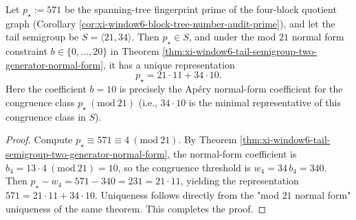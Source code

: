 \begin{corollary}[Ap\'ery Normal Form and Uniqueness of the Audit Prime \texorpdfstring{$p_\star=571$}{p*=571} for the Tail Semigroup]\label{cor:xi-audit-prime-571-apery-normal-form}
Let \(p_\star:=571\) be the spanning-tree fingerprint prime of the four-block quotient graph (Corollary \ref{cor:xi-window6-block-tree-number-audit-prime}), and let the tail semigroup be \(S=\langle 21,34\rangle\).
Then \(p_\star\in S\), and under the mod \(21\) normal form constraint \(b\in\{0,\dots,20\}\) in Theorem \ref{thm:xi-window6-tail-semigroup-two-generator-normal-form}, it has a unique representation
\[
p_\star=21\cdot 11+34\cdot 10.
\]
Here the coefficient \(b=10\) is precisely the Ap\'ery normal-form coefficient for the congruence class \(p_\star\ (\mathrm{mod}\ 21)\) (i.e., \(34\cdot 10\) is the minimal representative of this congruence class in \(S\)).
\end{corollary}

\begin{proof}
Compute \(p_\star\equiv 571\equiv 4\ (\mathrm{mod}\ 21)\).
By Theorem \ref{thm:xi-window6-tail-semigroup-two-generator-normal-form}, the normal-form coefficient is
\(
b_{4}=13\cdot 4\ (\mathrm{mod}\ 21)=10
\), so the congruence threshold is \(w_4=34\,b_4=340\).
Then
\(
p_\star-w_4=571-340=231=21\cdot 11
\), yielding the representation \(571=21\cdot 11+34\cdot 10\).
Uniqueness follows directly from the "mod \(21\) normal form" uniqueness of the same theorem. This completes the proof.
\end{proof}
